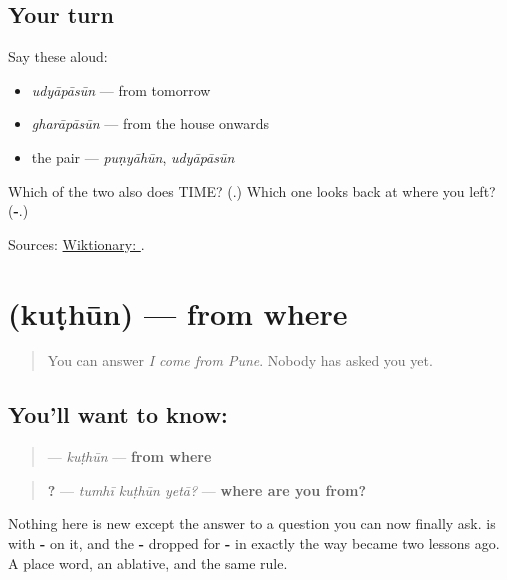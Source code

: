 \subsection*{Your turn}
Say these aloud:

\begin{itemize}
\raggedright
  \item \emph{udyāpāsūn} — from tomorrow
  \item \emph{gharāpāsūn} — from the house onwards
  \item the pair — \emph{puṇyāhūn}, \emph{udyāpāsūn}
\end{itemize}

\begin{tcolorbox}[breakable,colback=teal!4,colframe=teal!35!black,title={Before you move on}]
Which of the two also does TIME? (\textbf{}.) Which one looks back at where you left? (\textbf{-}.)

Sources: \href{https://en.wiktionary.org/wiki/\%E0\%A4\%AA\%E0\%A4\%BE\%E0\%A4\%B8\%E0\%A5\%82\%E0\%A4\%A8}{Wiktionary: }.
\end{tcolorbox}
\section[\texorpdfstring{\mr{कुठून} (kuṭhūn)}{कुठून (kuṭhūn)}]{ (kuṭhūn) — from where}

\label{lesson:MR-C46-kuthun}



\begin{quote}
You can answer \emph{I come from Pune}. Nobody has asked you yet.
\end{quote}

\subsection*{You'll want to know: }
\begin{quote}
\textbf{} — \emph{kuṭhūn} — \textbf{from where}
\end{quote}

\begin{quote}
\textbf{  ?} — \emph{tumhī kuṭhūn yetā?} — \textbf{where are you from?}
\end{quote}

Nothing here is new except the answer to a question you can now finally ask. \textbf{} is \textbf{} with \textbf{-} on it, and the \textbf{-} dropped for \textbf{-} in exactly the way \textbf{} became \textbf{} two lessons ago. A place word, an ablative, and the same rule.

